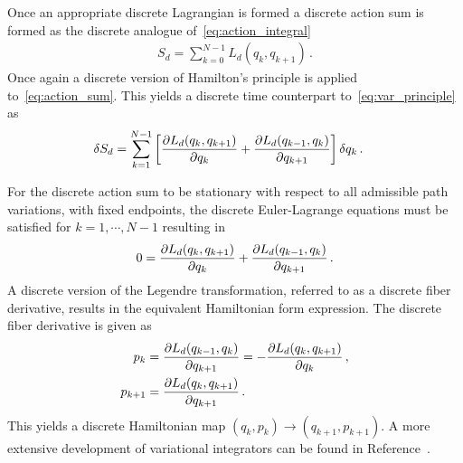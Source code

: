 \documentclass[preprint]{elsarticle}
\begin{document}
Once an appropriate discrete Lagrangian is formed a discrete action sum is formed as the discrete analogue of~\cref{eq:action_integral}
\begin{align}\label{eq:action_sum}
	S_d = \sum_{k=0}^{N-1} L_d(q_k, q_{k+1}) \, .
\end{align}
Once again a discrete version of Hamilton's principle is applied to~\cref{eq:action_sum}.
This yields a discrete time counterpart to~\cref{eq:var_principle} as
\begin{align}\label{eq:dis_var_principle}
	\delta S_d %
	&= \sum_{k=1}^{N-1} \bracket{ \deriv{L_d(q_k, q_{k+1})}{q_k} + \deriv{L_d(q_{k-1}, q_k)}{q_{k+1}}} \delta q_k \, .
\end{align}

For the discrete action sum to be stationary with respect to all admissible path variations, with fixed endpoints, the discrete Euler-Lagrange equations must be satisfied for \( k = 1, \cdots, N-1 \) resulting in
\begin{align}\label{eq:discrete_euler-lagrange}
	0 = \frac{\partial L_d(q_k, q_{k+1})}{\partial q_k} + \frac{\partial L_d(q_{k-1}, q_k)}{\partial q_{k+1}} \, .
\end{align}
A discrete version of the Legendre transformation, referred to as a discrete fiber derivative, results in the equivalent Hamiltonian form expression.
The discrete fiber derivative is given as 
\begin{subequations}\label{eq:discrete_legendre}
\begin{align}
	p_k &= \frac{\partial L_d(q_{k-1},q_k)}{\partial q_{k+1}} = - \frac{\partial L_d(q_k, q_{k+1})}{\partial q_k} \, ,\\
	p_{k+1} &= \frac{\partial L_d(q_k, q_{k+1})}{\partial q_{k+1}} \, .
\end{align}
\end{subequations}
This yields a discrete Hamiltonian map \( (q_k, p_k) \to (q_{k+1}, p_{k+1}) \).
A more extensive development of variational integrators can be found in Reference~.
\end{document}
